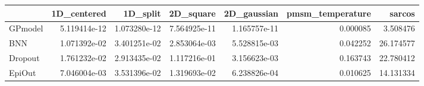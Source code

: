 \begin{tabular}{lrrrrrr}
\toprule
{} &   1D\_centered &      1D\_split &     2D\_square &   2D\_gaussian &  pmsm\_temperature &     sarcos \\
\midrule
GPmodel &  5.119414e-12 &  1.073280e-12 &  7.564925e-11 &  1.165757e-11 &          0.000085 &   3.508476 \\
BNN     &  1.071392e-02 &  3.401251e-02 &  2.853064e-03 &  5.528815e-03 &          0.042252 &  26.174577 \\
Dropout &  1.761232e-02 &  2.913435e-02 &  1.117216e-01 &  3.156623e-03 &          0.163743 &  22.780412 \\
EpiOut  &  7.046004e-03 &  3.531396e-02 &  1.319693e-02 &  6.238826e-04 &          0.010625 &  14.131334 \\
\bottomrule
\end{tabular}
